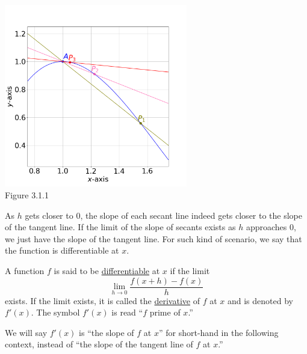 \documentclass[11pt]{book}
\theoremstyle{break}
\theoremstyle{no_label}
\newcommand{\figtag}[1]{\\[-1.2em]Figure {#1}}
\numberwithin{equation}{section}
\begin{document}
\begin{center}
    \includegraphics[width=0.6\textwidth]{sec_to_tan.png}\figtag{3.1.1}
\end{center}

As $h$ gets closer to $0$, the slope of each secant line indeed gets closer to the slope of the tangent line. If the limit of the slope of secants exists as $h$ approaches $0$, we just have the slope of the tangent line. For such kind of scenario, we say that the function is differentiable at $x$.

\begin{definition}
    A function $f$ is said to be \underline{differentiable} at $x$ if the limit $$\lim_{h\to 0}\dfrac{f(x+h)-f(x)}{h}$$ exists. If the limit exists, it is called the \underline{derivative} of $f$ at $x$ and is denoted by $f'(x)$. The symbol $f'(x)$ is read ``$f$ prime of $x$.''
\end{definition}

\begin{remark}
    We will say $f'(x)$ is ``the slope of $f$ at $x$'' for short-hand in the following context, instead of ``the slope of the tangent line of $f$ at $x$.''
\end{remark}
\end{document}
